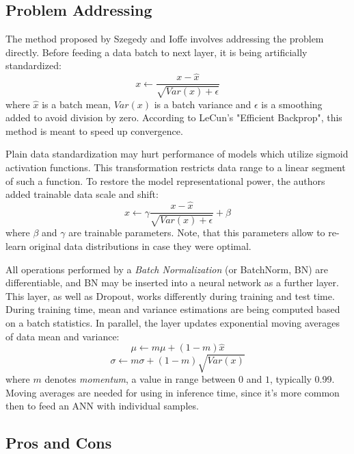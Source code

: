 \documentclass[thesis=B,english]{FITthesis}[2019/12/23]
\begin{document}
\subsection{Problem Addressing}

The method proposed by Szegedy and Ioffe involves addressing the problem directly. Before feeding a data batch to next layer, it is being artificially standardized:
\[x \longleftarrow \frac{x - \hat{x}}{\sqrt{Var(x) + \epsilon}}\]
where $\hat{x}$ is a batch mean, $Var(x)$ is a batch variance and $\epsilon$ is a smoothing added to avoid division by zero. According to LeCun's "Efficient Backprop"\cite{efficient_backprop}, this method is meant to speed up convergence.

Plain data standardization may hurt performance of models which utilize sigmoid activation functions. This transformation restricts data range to a linear segment of such a function. To restore the model representational power, the authors added trainable data scale and shift:
\[x \longleftarrow \gamma\frac{x - \hat{x}}{\sqrt{Var(x) + \epsilon}} + \beta\]
where $\beta$ and $\gamma$ are trainable parameters. Note, that this parameters allow to re-learn original data distributions in case they were optimal.

All operations performed by a \textit{Batch Normalization} (or BatchNorm, BN) are differentiable, and BN may be inserted into a neural network as a further layer. This layer, as well as Dropout\cite{dropout}, works differently during training and test time. During training time, mean and variance estimations are being computed based on a batch statistics. In parallel, the layer updates exponential moving averages of data mean and variance:
\[\mu \longleftarrow m \mu + (1 - m) \hat{x}\]
\[\sigma \longleftarrow m \sigma + (1 - m) \sqrt{Var(x)}\]
where $m$ denotes \textit{momentum}, a value in range between $0$ and $1$, typically 0.99. Moving averages are needed for using in inference time, since it's more common then to feed an ANN with individual samples.

\subsection{Pros and Cons}
\end{document}
